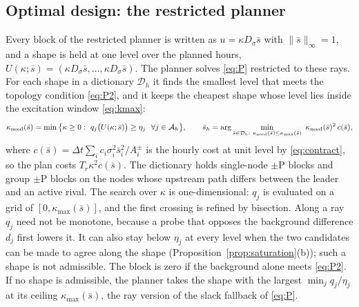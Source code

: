 \documentclass[journal,onecolumn,11pt]{IEEEtran}
\begin{document}
\subsection{Optimal design: the restricted planner}
Every block of the restricted planner is written as $u=\kappa D_\sigma\bar s$ with $\|\bar s\|_\infty=1$, and a shape is held at one level over the planned hours, $U(\kappa;\bar s)=(\kappa D_\sigma\bar s,\dots,\kappa D_\sigma\bar s)$. The planner solves \eqref{eq:P} restricted to these rays. For each shape in a dictionary $\mathcal D_h$ it finds the smallest level that meets the topology condition \eqref{eq:P2}, and it keeps the cheapest shape whose level lies inside the excitation window \eqref{eq:kmax}:
\begin{equation}\label{eq:dict}
\kappa_{\rm need}(\bar s)=\min\big\{\kappa\ge0:\ q_j\big(U(\kappa;\bar s)\big)\ge\eta_j\ \ \forall j\in\mathcal A_h\big\},\qquad
\bar s_h=\arg\min_{\bar s\in\mathcal D_h:\ \kappa_{\rm need}(\bar s)\le\kappa_{\max}(\bar s)}\ \kappa_{\rm need}(\bar s)^2\,c(\bar s),
\end{equation}
where $c(\bar s)=\Delta t\sum_ic_i\sigma_i^2\bar s_i^2/A_i^{\pm}$ is the hourly cost at unit level by \eqref{eq:contract}, so the plan costs $T_r\kappa^2c(\bar s)$. The dictionary holds single-node $\pm$P blocks and group $\pm$P blocks on the nodes whose upstream path differs between the leader and an active rival. The search over $\kappa$ is one-dimensional: $q_j$ is evaluated on a grid of $[0,\kappa_{\max}(\bar s)]$, and the first crossing is refined by bisection. Along a ray $q_j$ need not be monotone, because a probe that opposes the background difference $d_j$ first lowers it. It can also stay below $\eta_j$ at every level when the two candidates can be made to agree along the shape (Proposition~\ref{prop:saturation}(b)); such a shape is not admissible. The block is zero if the background alone meets \eqref{eq:P2}. If no shape is admissible, the planner takes the shape with the largest $\min_jq_j/\eta_j$ at its ceiling $\kappa_{\max}(\bar s)$, the ray version of the slack fallback of \eqref{eq:P}.
\end{document}
